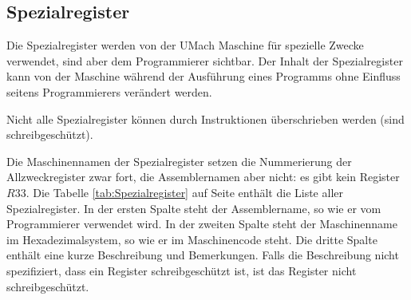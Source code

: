 \subsection{Spezialregister}
Die Spezialregister werden von der UMach Maschine für spezielle Zwecke
verwendet, sind aber dem Programmierer sichtbar. Der Inhalt der Spezialregister
kann von der Maschine während der Ausführung eines Programms ohne Einfluss
seitens Programmierers verändert werden.

Nicht alle Spezialregister können durch Instruktionen überschrieben werden
(sind schreibgeschützt).

Die Maschinennamen der Spezialregister setzen die Nummerierung der
Allzweckregister zwar fort, die Assemblernamen aber nicht: es gibt kein Register
$R33$.
Die Tabelle \ref{tab:Spezialregister} auf Seite \pageref{tab:Spezialregister}
enthält die Liste aller Spezialregister. In der ersten
Spalte steht der Assemblername, so wie er vom Programmierer verwendet wird. In
der zweiten Spalte steht der Maschinenname im Hexadezimalsystem, so wie er im
Maschinencode steht.
Die dritte Spalte enthält eine kurze Beschreibung und Bemerkungen.
Falls die Beschreibung nicht spezifiziert, dass ein Register schreibgeschützt
ist, ist das Register nicht schreibgeschützt.

